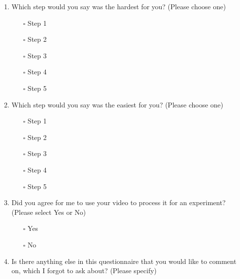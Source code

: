 \begin{enumerate}
    \item Which step would you say was the hardest for you? (Please choose one)\\
    \begin{itemize}
        \item[$\square$]Step 1
        \item[$\square$] Step 2
        \item[$\square$] Step 3
        \item[$\square$] Step 4
        \item[$\square$] Step 5
    \end{itemize}
    
    \item Which step would you say was the easiest for you? (Please choose one)\\
    \begin{itemize}
        \item[$\square$] Step 1
        \item[$\square$] Step 2
        \item[$\square$] Step 3
        \item[$\square$] Step 4
        \item[$\square$] Step 5
    \end{itemize}
    
    \item Did you agree for me to use your video to process it for an experiment? (Please select Yes or No)\\
    \begin{itemize}
        \item[$\square$] Yes
        \item[$\square$] No
    \end{itemize}
    
    \item Is there anything else in this questionnaire that you would like to comment on, which I forgot to ask about? (Please specify)\\
\end{enumerate}




